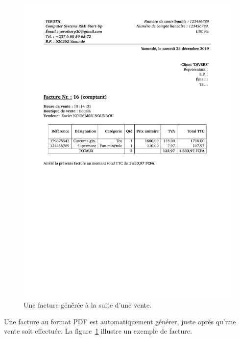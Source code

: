 \begin{figure}[!htbp]
	\centering
	\includegraphics[scale=0.75]{images/yeren-facture-grand-2017-06-13.pdf}
	\caption{Une facture g\'en\'er\'ee \`a la suite d'une vente.}
	\label{fig:yeren-vendre-facture}
\end{figure}

Une facture au format PDF est automatiquement
g\'en\'erer, juste apr\`es qu'une vente soit effectu\'ee.
La figure~\ref{fig:yeren-vendre-facture} illustre un
exemple de facture.



